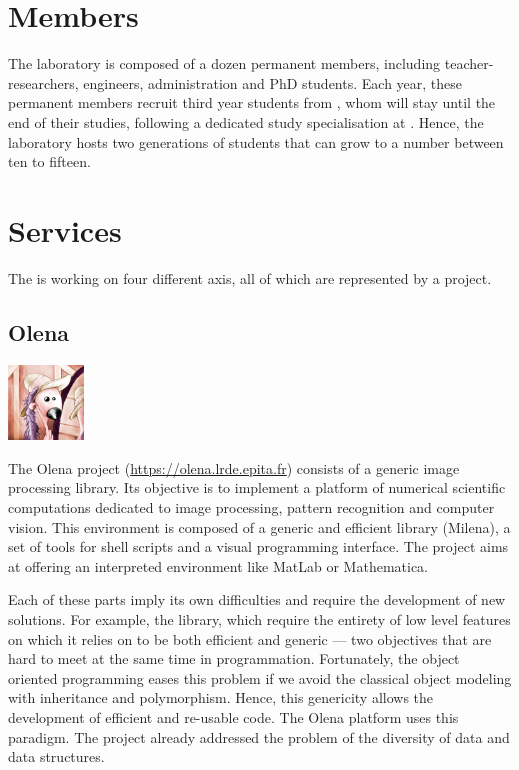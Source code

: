 \section{Members}
The laboratory is composed of a dozen permanent members, including teacher-researchers, engineers,
administration and PhD students. Each year, these permanent members recruit third year students
from \EPITA\space, whom will stay until the end of their studies, following a dedicated study specialisation
at \EPITA\space. Hence, the laboratory hosts two generations of students that can grow to a number
between ten to fifteen.


\section{Services}
The \LRDE\space is working on four different axis, all of which are represented by a project.


\subsection{Olena}
\begin{center}
 \includegraphics[width=2cm]{img/olena.jpg}
\end{center}
The Olena project (\url{https://olena.lrde.epita.fr}) consists of a generic image processing library.
Its objective is to implement a platform of numerical scientific computations dedicated to image
processing, pattern recognition and computer vision. This environment is composed of a generic and
efficient library (Milena), a set of tools for shell scripts and a visual programming interface.
The project aims at offering an interpreted environment like MatLab or Mathematica.

Each of these parts imply its own difficulties and require the development of new solutions.
For example, the library, which require the entirety of low level features on which it relies on to be
both efficient and generic --- two objectives that are hard to meet at the same time in programmation.
Fortunately, the object oriented programming eases this problem if we avoid the classical object
modeling with inheritance and polymorphism. Hence, this genericity allows the development of efficient
and re-usable code. The Olena platform uses this paradigm. The project already addressed the problem
of the diversity of data and data structures.

